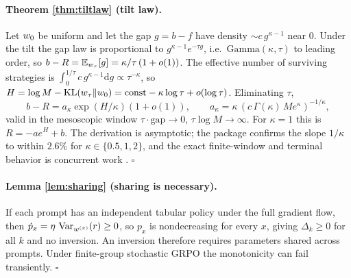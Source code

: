 \paragraph{Theorem \ref{thm:tiltlaw} (tilt law).}
Let $w_0$ be uniform and let the gap $g=b-f$ have density $\sim c\,g^{\kappa-1}$
near $0$. Under the tilt the gap law is proportional to
$g^{\kappa-1}e^{-\tau g}$, i.e.\ $\mathrm{Gamma}(\kappa,\tau)$ to leading order,
so $b-R=\mathbb{E}_{w_\tau}[g]=\kappa/\tau\,(1+o(1))$. The effective number of surviving
strategies is $\int_0^{1/\tau}c\,g^{\kappa-1}\mathrm dg\propto\tau^{-\kappa}$, so
$H=\log M-\mathrm{KL}(w_\tau\|w_0)=\text{const}-\kappa\log\tau+o(\log\tau)$.
Eliminating $\tau$,
\[
b-R=a_\kappa\exp(H/\kappa)(1+o(1)),\qquad
a_\kappa=\kappa\,(c\,\Gamma(\kappa)\,M e^{\kappa})^{-1/\kappa},
\]
valid in the mesoscopic window $\tau\cdot\text{gap}\to0$, $\tau\log M\to\infty$.
For $\kappa=1$ this is $R=-a e^H+b$. The derivation is asymptotic; the package
confirms the slope $1/\kappa$ to within $2.6\%$ for $\kappa\in\{0.5,1,2\}$, and
the exact finite-window and terminal behavior is concurrent work
\citep{cui2025entropy}. $\square$

\paragraph{Lemma \ref{lem:sharing} (sharing is necessary).}
If each prompt has an independent tabular policy under the full gradient flow,
then $\dot p_x=\eta\,\operatorname{Var}_{w^{(x)}}(r)\ge0$, so $p_x$ is nondecreasing for every
$x$, giving $\Delta_k\ge0$ for all $k$ and no inversion. An inversion therefore
requires parameters shared across prompts. Under finite-group stochastic GRPO the
monotonicity can fail transiently. $\square$